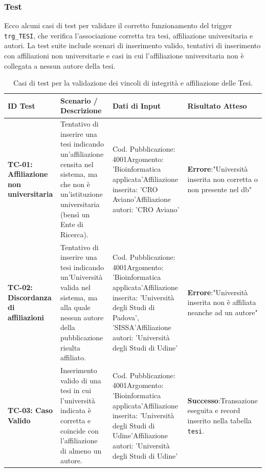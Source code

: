 \documentclass[a4paper,12pt]{article}
\begin{document}
\subsubsection*{Test}
Ecco alcuni casi di test per validare il corretto funzionamento del trigger \texttt{trg\_TESI}, che verifica l'associazione corretta tra tesi, affiliazione universitaria e autori. La test suite include scenari di inserimento valido, tentativi di inserimento con affiliazioni non universitarie e casi in cui l'affiliazione universitaria non è collegata a nessun autore della tesi.
\begin{table}[htbp]
\centering
\small
\caption{Casi di test per la validazione dei vincoli di integrità e affiliazione delle Tesi.}
\label{tab:casi_test_tesi}
\begin{tabularx}{\textwidth}{X X X X}
\toprule
\textbf{ID Test} & \textbf{Scenario / Descrizione} & \textbf{Dati di Input} & \textbf{Risultato Atteso} \\ 
\midrule
\textbf{TC-01: Affiliazione non universitaria} & 
Tentativo di inserire una tesi indicando un'affiliazione censita nel sistema, ma che non è un'istituzione universitaria (bensì un Ente di Ricerca). & 
Cod. Pubblicazione: 4001\newline Argomento: 'Bioinformatica applicata'\newline Affiliazione inserita: 'CRO Aviano'\newline Affiliazione autori: 'CRO Aviano' & 
\textbf{Errore}:\newline "Università inserita non corretta o non presente nel db" \\ 
\midrule
\textbf{TC-02: Discordanza di affiliazioni} & 
Tentativo di inserire una tesi indicando un'Università valida nel sistema, ma alla quale nessun autore della pubblicazione risulta affiliato. & 
Cod. Pubblicazione: 4001\newline Argomento: 'Bioinformatica applicata'\newline Affiliazione inserita: 'Università degli Studi di Padova', 'SISSA'\newline Affiliazione autori: 'Università degli Studi di Udine' & 
\textbf{Errore}:\newline "Università inserita non è affiliata neanche ad un autore" \\ 
\midrule
\textbf{TC-03: Caso Valido} & 
Inserimento valido di una tesi in cui l'università indicata è corretta e coincide con l'affiliazione di almeno un autore. & 
Cod. Pubblicazione: 4001\newline Argomento: 'Bioinformatica applicata'\newline Affiliazione inserita: 'Università degli Studi di Udine'\newline Affiliazione autori: 'Università degli Studi di Udine' & 
\textbf{Successo}:\newline Transazione eseguita e record inserito nella tabella \texttt{tesi}. \\ 
\bottomrule
\end{tabularx}
\end{table}
\newpage
\end{document}
